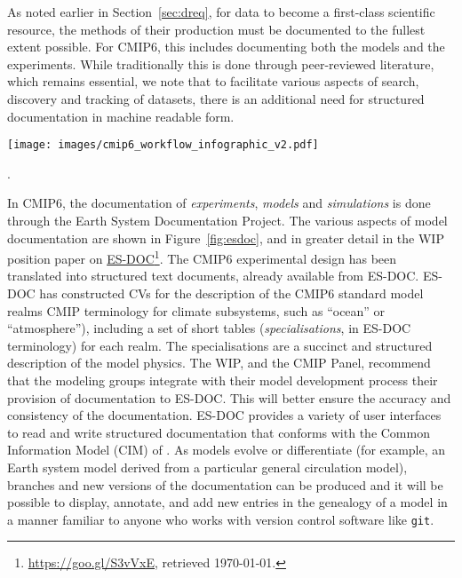 \documentclass[gmd,manuscript]{copernicus}
\newcommand{\pllabel}[1]{\label{p-#1}\linelabel{l-#1}}
\newcommand{\urlref}[2] {\href{#1}{#2}\footnote{\url{#1}, retrieved \today.}}
\begin{document}
As noted earlier in Section~\ref{sec:dreq}, for data to become a
first-class scientific resource, the methods of their production must
be documented to the fullest extent possible. For CMIP6, this includes
documenting both the models and the experiments. While traditionally
this is done through peer-reviewed literature, which remains
essential, we note that to facilitate various aspects of search,
discovery and tracking of datasets, there is an additional need for
structured documentation in machine readable form.

\begin{figure*}
  \begin{center}
    \texttt{[image: images/cmip6\_workflow\_infographic\_v2.pdf]}
  \end{center}
  \caption{Elements of ES-DOC documentation. Rows indicate phases of
    the modeling process being documented, and box colors indicate the
    parties responsible for producing the documentation (see legend).
    Figure courtesy Guillaume Levavasseur, IPSL}.
  \label{fig:esdoc}
\end{figure*}

In CMIP6, the documentation of \emph{experiments}, \emph{models} and
\emph{simulations} is done through the Earth System Documentation
\citep[\urlref{https://goo.gl/WNwKD9}{ES-DOC},][]{ref:guilyardietal2013}
Project. The various aspects of model documentation are shown in
Figure~\ref{fig:esdoc}, and in greater detail in the WIP position
paper on \urlref{https://goo.gl/S3vVxE}{ES-DOC}. The CMIP6
experimental design has been translated into structured text
documents, already available from ES-DOC. ES-DOC has constructed CVs
for the description of the CMIP6 standard model realms
\pllabel{RC1-52}
CMIP terminology for climate subsystems, such as ``ocean'' or
``atmosphere''), including a set of short tables
(\emph{specialisations}, in ES-DOC terminology) for each realm.
\pllabel{RC1-53}
The specialisations are a succinct and structured description of the
model physics. The WIP, and the CMIP Panel, recommend that the
modeling groups integrate with their model development process their
provision of documentation to ES-DOC. This will better ensure the
accuracy and consistency of the documentation. ES-DOC provides a
variety of user interfaces to read and write structured documentation
that conforms with the Common Information Model (CIM) of
\cite{ref:lawrenceetal2012}. As models evolve or differentiate (for
example, an Earth system model derived from a particular general
circulation model), branches and new versions of the documentation can
be produced
\pllabel{RC1-54}
and it will be possible to display, annotate, and add new entries in
the genealogy of a model in a manner familiar to anyone who works with
version control software like \texttt{git}.
\end{document}

